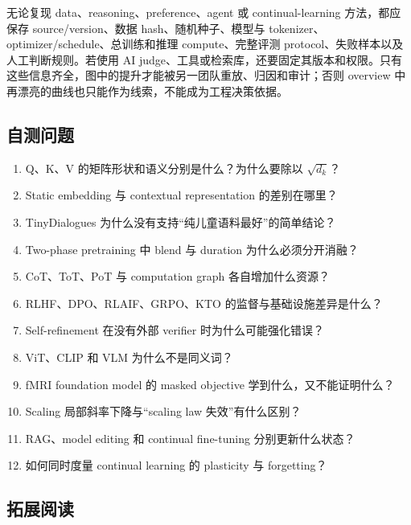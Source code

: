 无论复现 data、reasoning、preference、agent 或 continual-learning 方法，都应保存 source/version、数据 hash、随机种子、模型与 tokenizer、optimizer/schedule、总训练和推理 compute、完整评测 protocol、失败样本以及人工判断规则。若使用 AI judge、工具或检索库，还要固定其版本和权限。只有这些信息齐全，图中的提升才能被另一团队重放、归因和审计；否则 overview 中再漂亮的曲线也只能作为线索，不能成为工程决策依据。

\subsection{自测问题}

\begin{enumerate}
  \item Q、K、V 的矩阵形状和语义分别是什么？为什么要除以 $\sqrt{d_k}$？
  \item Static embedding 与 contextual representation 的差别在哪里？
  \item TinyDialogues 为什么没有支持“纯儿童语料最好”的简单结论？
  \item Two-phase pretraining 中 blend 与 duration 为什么必须分开消融？
  \item CoT、ToT、PoT 与 computation graph 各自增加什么资源？
  \item RLHF、DPO、RLAIF、GRPO、KTO 的监督与基础设施差异是什么？
  \item Self-refinement 在没有外部 verifier 时为什么可能强化错误？
  \item ViT、CLIP 和 VLM 为什么不是同义词？
  \item fMRI foundation model 的 masked objective 学到什么，又不能证明什么？
  \item Scaling 局部斜率下降与“scaling law 失效”有什么区别？
  \item RAG、model editing 和 continual fine-tuning 分别更新什么状态？
  \item 如何同时度量 continual learning 的 plasticity 与 forgetting？
\end{enumerate}

\subsection{拓展阅读}

